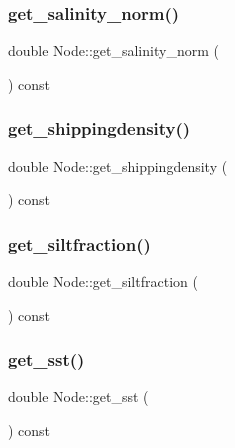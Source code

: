 \subsubsection{\texorpdfstring{get\_salinity\_norm()}{get\_salinity\_norm()}}
{\footnotesize\ttfamily double Node\+::get\+\_\+salinity\+\_\+norm (\begin{DoxyParamCaption}{ }\end{DoxyParamCaption}) const}

\mbox{\label{class_node_a4c8f7862b87a61425fec4d4d59bdadbb}} 
\subsubsection{\texorpdfstring{get\_shippingdensity()}{get\_shippingdensity()}}
{\footnotesize\ttfamily double Node\+::get\+\_\+shippingdensity (\begin{DoxyParamCaption}{ }\end{DoxyParamCaption}) const}

\mbox{\label{class_node_a95ac62115588e015be01b321744bc20d}} 
\subsubsection{\texorpdfstring{get\_siltfraction()}{get\_siltfraction()}}
{\footnotesize\ttfamily double Node\+::get\+\_\+siltfraction (\begin{DoxyParamCaption}{ }\end{DoxyParamCaption}) const}

\mbox{\label{class_node_a415da489121104abacc90e9cb1a92805}} 
\subsubsection{\texorpdfstring{get\_sst()}{get\_sst()}}
{\footnotesize\ttfamily double Node\+::get\+\_\+sst (\begin{DoxyParamCaption}{ }\end{DoxyParamCaption}) const}

\mbox{\label{class_node_a599facf298e04d5c59239a5566e62787}} 
